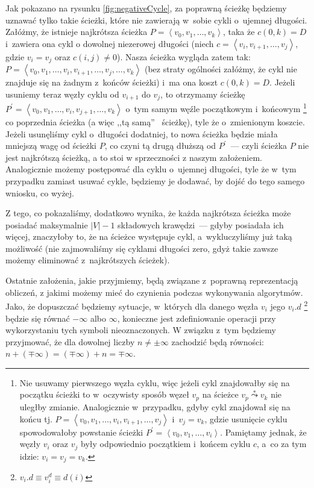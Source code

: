 Jak pokazano na rysunku \ref{fig:negativeCycle}, za poprawną ścieżkę będziemy uznawać tylko takie ścieżki, które nie zawierają w~sobie cykli o~ujemnej długości. Załóżmy, że istnieje najkrótsza ścieżka $P = \left \langle v_{0}, v_{1}, \ldots, v_{k} \right \rangle $, taka że $c \left( 0, k \right) = D$ i~zawiera ona cykl o dowolnej niezerowej długości (niech $c = \left \langle v_{i}, v_{i+1}, \ldots, v_{j} \right \rangle $, gdzie $v_{i} = v_{j} $ oraz $c \left( i, j \right) \neq 0$). Nasza ścieżka wygląda zatem tak: $P = \left \langle v_{0}, v_{1}, \ldots, v_{i}, v_{i+1}, \ldots, v_{j}, \ldots, v_{k} \right \rangle $ (bez straty ogólności załóżmy, że cykl nie znajduje się na żadnym z~końców ścieżki) i~ma ona koszt $c \left( 0, k \right) = D$. Jeżeli usuniemy teraz węzły cyklu od $v_{i+1}$ do $v_{j}$, to otrzymamy ścieżkę $P^{'} = \left \langle v_{0}, v_{1}, \ldots, v_{i}, v_{j+1}, \ldots, v_{k} \right \rangle $ o~tym samym węźle początkowym i~końcowym \footnote{Nie usuwamy pierwszego węzła cyklu, więc jeżeli cykl znajdowałby się na początku ścieżki to w~oczywisty sposób węzeł $v_{p}$ na ścieżce $v_{p} \overset{*}\leadsto v_{k}$ nie uległby zmianie. Analogicznie w~przypadku, gdyby cykl znajdował się na końcu tj. $P = \left \langle v_{0}, v_{1}, \ldots, v_{i}, v_{i+1}, \ldots, v_{j} \right \rangle $ i~$v_{j}=v_{k}$, gdzie usunięcie cyklu spowodowałoby powstanie ścieżki  $P^{'} = \left \langle v_{0}, v_{1}, \ldots, v_{i} \right \rangle $. Pamiętamy jednak, że węzły $v_{i}$ oraz $v_{j}$ były odpowiednio początkiem i~końcem cyklu $c$, a~co za tym idzie: $v_{i} = v_{j} = v_{k} $.} co poprzednia ścieżka (a więc ,,tą samą''~ ścieżkę), tyle że o~zmienionym koszcie. Jeżeli usunęliśmy cykl o~długości dodatniej, to nowa ścieżka będzie miała mniejszą wagę od ścieżki $P$, co czyni tą drugą dłuższą od $P^{'}$~---  czyli ścieżka $P$ nie jest najkrótszą ścieżką, a to stoi w sprzeczności z naszym założeniem. Analogicznie możemy postępować dla cyklu o~ujemnej długości, tyle że w~tym przypadku zamiast usuwać cykle, będziemy je dodawać, by dojść do tego samego wniosku, co wyżej.

Z tego, co pokazaliśmy, dodatkowo wynika, że każda najkrótsza ścieżka może posiadać maksymalnie $\left| V \right| - 1$ składowych krawędzi~---  gdyby posiadała ich więcej, znaczyłoby to, że na ścieżce występuje cykl, a~wykluczyliśmy już taką możliwość (nie zajmowaliśmy się cyklami długości zero, gdyż takie zawsze możemy eliminować z~najkrótszych ścieżek).

Ostatnie założenia, jakie przyjmiemy, będą związane z~poprawną reprezentacją obliczeń, z jakimi możemy mieć do czynienia podczas wykonywania algorytmów. Jako, że dopuszczać będziemy sytuacje, w~których dla danego węzła $v_{i}$ jego $v_{i}.d$ \footnote{$v_{i}.d \equiv v_{i}^{d} \equiv d \left( i\right)$} będzie się równać $- \infty$ albo $\infty$, konieczne jest zdefiniowanie operacji przy wykorzystaniu tych symboli nieoznaczonych. W związku z~tym będziemy przyjmować, że dla dowolnej liczby $n \neq \pm \infty$ zachodzić będą równości: $ n + \left( \mp \infty \right) = \left( \mp \infty \right) + n = \mp \infty$.

